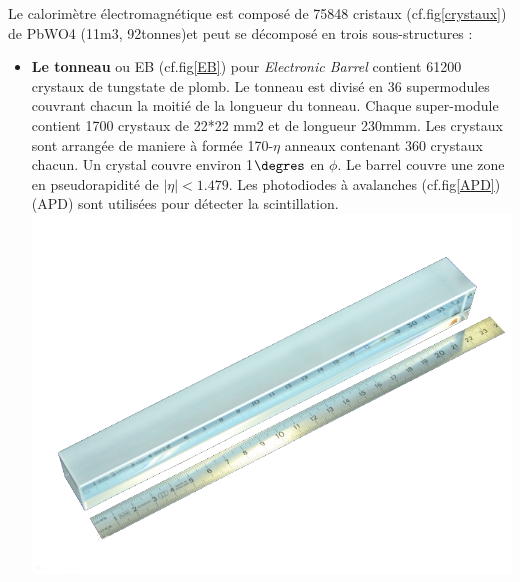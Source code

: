 Le calorimètre électromagnétique est composé de 75848 cristaux (cf.fig\ref{crystaux}) de PbWO4 (11m3, 92tonnes)et peut se décomposé en trois sous-structures :
\begin{itemize}[label=$\bullet$]
	\item \textbf{Le tonneau} ou EB (cf.fig\ref{EB}) pour \textit{Electronic Barrel} contient 61200 crystaux de tungstate de plomb. Le tonneau est divisé en 36 supermodules couvrant chacun la moitié de la longueur du tonneau. Chaque super-module contient 1700 crystaux de 22*22 mm2 et de longueur 230mmm. Les crystaux sont arrangée de maniere à formée 170-$\eta$ anneaux contenant 360 crystaux chacun. Un crystal couvre environ 1$\degres$ en $\phi$. Le barrel couvre une zone en pseudorapidité de $|\eta|<1.479$. Les photodiodes à avalanches (cf.fig\ref{APD}) (APD) sont utilisées pour détecter la scintillation.
		\marginpar
	{
		\includegraphics[width=\marginparwidth]{CMS/Crystaux.png}
		\label{crystaux}
	}
	

\end{itemize}
